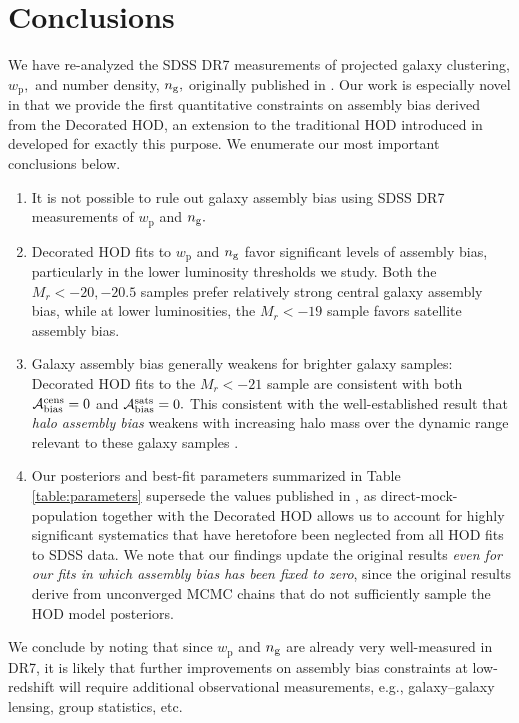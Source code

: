 \documentclass[usenatbib,usegraphicx,letterpaper]{mn2e}
\newcommand{\abias}{\mathcal{A}_{\rm bias}}
\newcommand{\wprp}{w_{\mathrm{p}}}
\newcommand{\magr}{M_r}
\newcommand{\ben}{\begin{enumerate}}
\newcommand{\een}{\end{enumerate}}
\begin{document}
\section{Conclusions}
\label{section:conclusions}

We have re-analyzed the SDSS DR7 measurements of projected galaxy clustering,  $\wprp,$ and number density, $n_{\rm g},$ originally published in \citet{zehavi_etal11}. Our work is especially novel in that we provide the first quantitative constraints on assembly bias derived from the Decorated HOD, an extension to the traditional HOD introduced in \citet{hearin_etal16} developed for exactly this purpose. 
We enumerate our most important conclusions below. 
\ben
\item It is not possible to rule out galaxy assembly bias using SDSS DR7 measurements of $\wprp$ and $n_{\rm g}.$
\item Decorated HOD fits to $\wprp$ and $n_{\rm g}$ favor significant levels of assembly bias, particularly in the lower luminosity thresholds we study. Both the $\magr<-20, -20.5$ samples prefer relatively strong central galaxy assembly bias, while at lower luminosities, the $\magr<-19$ sample favors satellite assembly bias. 
\item Galaxy assembly bias generally weakens for brighter galaxy samples: Decorated HOD fits to the $\magr<-21$ sample are consistent with both $\abias^{\rm cens}=0$ and $\abias^{\rm sats}=0.$ This consistent with the well-established result that {\em halo assembly bias} weakens with increasing halo mass over the dynamic range relevant to these galaxy samples \citep[see, e.g., Figure 8 of][and references therein]{hearin_etal16}. 
\item Our posteriors and best-fit parameters summarized in Table \ref{table:parameters} supersede the values published in \citet{zehavi_etal11}, as direct-mock-population together with the Decorated HOD allows us to account for highly significant systematics that have heretofore been neglected from all HOD fits to SDSS data. We note that our findings update the original \citet{zehavi_etal11} results {\em even for our fits in which assembly bias has been fixed to zero}, since the original results derive from unconverged MCMC chains that do not sufficiently sample the HOD model posteriors. 
\een
We conclude by noting that since $\wprp$ and $n_{\rm g}$ are already very well-measured in DR7, it is likely that further improvements on assembly bias constraints at low-redshift will require additional observational measurements, e.g., galaxy--galaxy lensing, group statistics, etc.
\end{document}
